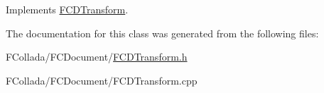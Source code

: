 Implements \hyperlink{classFCDTransform_afd7fc3c7dc012782ebb2886c5bc13d01}{FCDTransform}.



The documentation for this class was generated from the following files:\begin{DoxyCompactItemize}
\item 
FCollada/FCDocument/\hyperlink{FCDTransform_8h}{FCDTransform.h}\item 
FCollada/FCDocument/FCDTransform.cpp\end{DoxyCompactItemize}
